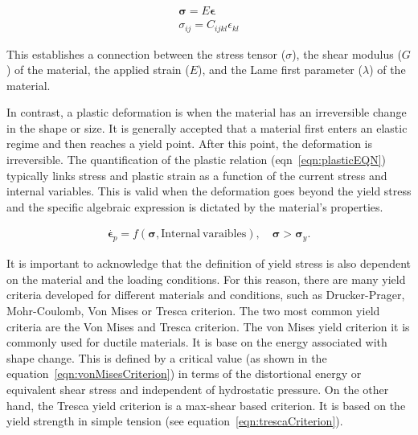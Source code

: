 \begin{gather}
    \bm{\sigma} = E\bm{\epsilon}\label{eqn:elasticEQN} \\
    \sigma_{ij} = C_{ijkl}\epsilon_{kl}
\end{gather}

This establishes a connection between the stress tensor ($\sigma$), the shear modulus ($G$) of the material, the applied strain ($E$), and the Lame first parameter ($\lambda$) of the material\citep{bonyadiReviewFrictionLubrication2020}.

In contrast, a plastic deformation is when the material has an irreversible change in the shape or size.
It is generally accepted that a material first enters an elastic regime and then reaches a yield point. 
After this point, the deformation is irreversible.
The quantification of the plastic relation (eqn~\eqref{eqn:plasticEQN}) typically links stress and plastic strain as a function of the current stress and internal variables.
This is valid when the deformation goes beyond the yield stress and the specific algebraic expression is dictated by the material's properties.

\begin{gather}
    \dot{\bm{\epsilon}_{p}} = f\left(\bm{\sigma},\mathrm{Internal~varaibles}\right),\quad\bm{\sigma}>\bm{\sigma}_{y}\label{eqn:plasticEQN}.
\end{gather}

It is important to acknowledge that the definition of yield stress\citep{bonnYieldStressMaterials2017} is also dependent on the material and the loading conditions.
For this reason, there are many yield criteria developed for different materials and conditions, such as Drucker-Prager, Mohr-Coulomb, Von Mises or Tresca criterion.
The two most common yield criteria are the Von Mises and Tresca criterion.
The von Mises yield criterion it is commonly used for ductile materials.
It is base on the energy associated with shape change. 
This is defined by a critical value (as shown in the equation~\eqref{eqn:vonMisesCriterion}) in terms of the distortional energy or equivalent shear stress and independent of hydrostatic pressure. 
On the other hand, the Tresca yield criterion is a max-shear based criterion.
It is based on the yield strength in simple tension (see equation~\eqref{eqn:trescaCriterion}).

